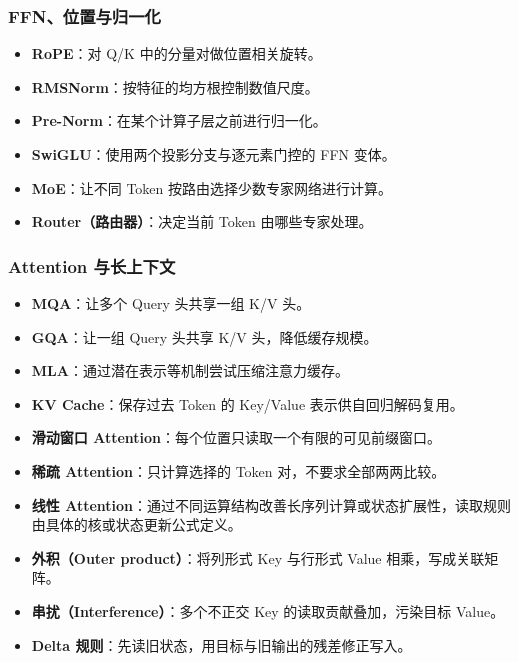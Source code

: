 \subsubsection*{FFN、位置与归一化}
\begin{itemize}
\item \textbf{RoPE}：对 Q/K 中的分量对做位置相关旋转。 
\item \textbf{RMSNorm}：按特征的均方根控制数值尺度。 
\item \textbf{Pre-Norm}：在某个计算子层之前进行归一化。 
\item \textbf{SwiGLU}：使用两个投影分支与逐元素门控的 FFN 变体。 
\item \textbf{MoE}：让不同 Token 按路由选择少数专家网络进行计算。 
\item \textbf{Router（路由器）}：决定当前 Token 由哪些专家处理。 
\end{itemize}

\subsubsection*{Attention 与长上下文}
\begin{itemize}
\item \textbf{MQA}：让多个 Query 头共享一组 K/V 头。 
\item \textbf{GQA}：让一组 Query 头共享 K/V 头，降低缓存规模。 
\item \textbf{MLA}：通过潜在表示等机制尝试压缩注意力缓存。 
\item \textbf{KV Cache}：保存过去 Token 的 Key/Value 表示供自回归解码复用。 
\item \textbf{滑动窗口 Attention}：每个位置只读取一个有限的可见前缀窗口。 
\item \textbf{稀疏 Attention}：只计算选择的 Token 对，不要求全部两两比较。 
\item \textbf{线性 Attention}：通过不同运算结构改善长序列计算或状态扩展性，读取规则由具体的核或状态更新公式定义。 
\item \textbf{外积（Outer product）}：将列形式 Key 与行形式 Value 相乘，写成关联矩阵。 
\item \textbf{串扰（Interference）}：多个不正交 Key 的读取贡献叠加，污染目标 Value。 
\item \textbf{Delta 规则}：先读旧状态，用目标与旧输出的残差修正写入。 
\end{itemize}

